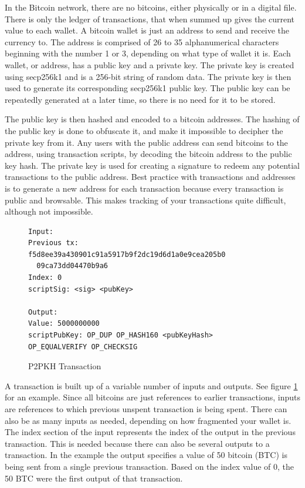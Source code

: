 \documentclass[12pt]{article}
\begin{document}
In the Bitcoin network, there are no bitcoins, either physically or in a digital file. There is only the ledger of transactions, that when summed up gives the current value to each wallet. A bitcoin wallet is just an address to send and receive the currency to. The address is comprised of 26 to 35 alphanumerical characters beginning with the number 1 or 3, depending on what type of wallet it is. Each wallet, or address, has a public key and a private key. The private key is created using secp256k1\cite{sigalg} and is a 256-bit string of random data. The private key is then used to generate its corresponding secp256k1 public key. The public key can be repeatedly generated at a later time, so there is no need for it to be stored. 

The public key is then hashed and encoded to a bitcoin addresses. The hashing of the public key is done to obfuscate it, and make it impossible to decipher the private key from it. Any users with the public address can send bitcoins to the address, using transaction scripts, by decoding the bitcoin address to the public key hash. The private key is used for creating a signature to redeem any potential transactions to the public address. Best practice with transactions and addresses is to generate a new address for each transaction because every transaction is public and browsable. This makes tracking of your transactions quite difficult, although not impossible\cite{meiklejohn2013fistful}. 

\begin{figure}[h!]
\begin{lstlisting}[numbers=none]
Input:
Previous tx: f5d8ee39a430901c91a5917b9f2dc19d6d1a0e9cea205b0
  09ca73dd04470b9a6
Index: 0
scriptSig: <sig> <pubKey>

Output:
Value: 5000000000
scriptPubKey: OP_DUP OP_HASH160 <pubKeyHash>
OP_EQUALVERIFY OP_CHECKSIG
 \end{lstlisting}
 \caption{P2PKH Transaction}
 \label{fig:transaction}
\end{figure}

A transaction is built up of a variable number of inputs and outputs. See figure \ref{fig:transaction} for an example. Since all bitcoins are just references to earlier transactions, inputs are references to which previous unspent transaction is being spent. There can also be as many inputs as needed, depending on how fragmented your wallet is. The index section of the input represents the index of the output in the previous transaction. This is needed because there can also be several outputs to a transaction. In the example the output specifies a value of 50 bitcoin (BTC) is being sent from a single previous transaction. Based on the index value of 0, the 50 BTC were the first output of that transaction. 
\end{document}
